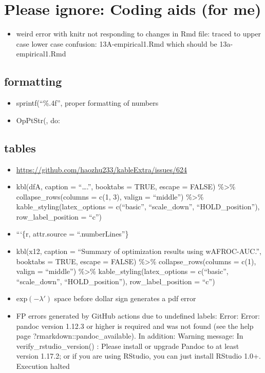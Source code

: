 \documentclass[
]{book}
\providecommand{\tightlist}{%
  \setlength{\itemsep}{0pt}\setlength{\parskip}{0pt}}
\begin{document}
\hypertarget{please-ignore-coding-aids-for-me}{%
\section{Please ignore: Coding aids (for me)}\label{please-ignore-coding-aids-for-me}}

\begin{itemize}
\tightlist
\item
  weird error with knitr not responding to changes in Rmd file: traced to upper case lower case confusion: 13A-empirical1.Rmd which should be 13a-empirical1.Rmd
\end{itemize}

\hypertarget{formatting}{%
\subsection{formatting}\label{formatting}}

\begin{itemize}
\tightlist
\item
  sprintf(``\%.4f'', proper formatting of numbers
\item
  OpPtStr(, do:
\end{itemize}

\hypertarget{tables}{%
\subsection{tables}\label{tables}}

\begin{itemize}
\tightlist
\item
  \url{https://github.com/haozhu233/kableExtra/issues/624}
\item
  kbl(dfA, caption = ``\ldots.'', booktabs = TRUE, escape = FALSE) \%\textgreater\% collapse\_rows(columns = c(1, 3), valign = ``middle'') \%\textgreater\% kable\_styling(latex\_options = c(``basic'', ``scale\_down'', ``HOLD\_position''), row\_label\_position = ``c'')
\item
  ```\{r, attr.source = ``.numberLines''\}
\item
  kbl(x12, caption = ``Summary of optimization results using wAFROC-AUC.'', booktabs = TRUE, escape = FALSE) \%\textgreater\% collapse\_rows(columns = c(1), valign = ``middle'') \%\textgreater\% kable\_styling(latex\_options = c(``basic'', ``scale\_down'', ``HOLD\_position''), row\_label\_position = ``c'')
\item
  \(\text{exp} \left ( -\lambda' \right )\) space before dollar sign generates a pdf error
\item
  FP errors generated by GitHub actions due to undefined labels:
  Error: Error: pandoc version 1.12.3 or higher is required and was not found (see the help page ?rmarkdown::pandoc\_available).
  In addition: Warning message:
  In verify\_rstudio\_version() :
  Please install or upgrade Pandoc to at least version 1.17.2; or if you are using RStudio, you can just install RStudio 1.0+.
  Execution halted
\end{itemize}
\end{document}
